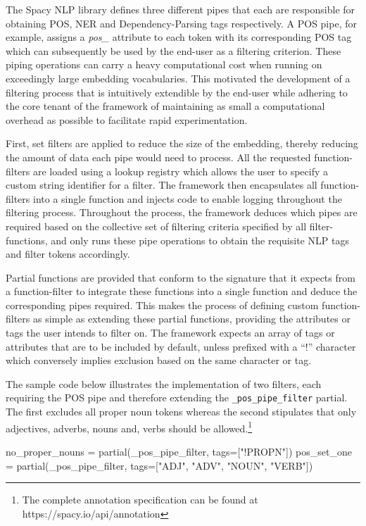 \documentclass[../../fyp.tex]{subfiles}
\begin{document}
The Spacy NLP library defines three different pipes that each are responsible for obtaining POS, NER and Dependency-Parsing tags respectively. A POS pipe, for example, assigns a \textit{pos\_} attribute to each token with its corresponding POS tag which can subsequently be used by the end-user as a filtering criterion. These piping operations can carry a heavy computational cost when running on exceedingly large embedding vocabularies. This motivated the development of a filtering process that is intuitively extendible by the end-user while adhering to the core tenant of the framework of maintaining as small a computational overhead as possible to facilitate rapid experimentation.

First, set filters are applied to reduce the size of the embedding, thereby reducing the amount of data each pipe would need to process. All the requested function-filters are loaded using a lookup registry which allows the user to specify a custom string identifier for a filter. The framework then encapsulates all function-filters into a single function and injects code to enable logging throughout the filtering process. Throughout the process, the framework deduces which pipes are required based on the collective set of filtering criteria specified by all filter-functions, and only runs these pipe operations to obtain the requisite NLP tags and filter tokens accordingly.

Partial functions are provided that conform to the signature that it expects from a function-filter to integrate these functions into a single function and deduce the corresponding pipes required. This makes the process of defining custom function-filters as simple as extending these partial functions, providing the attributes or tags the user intends to filter on. The framework expects an array of tags or attributes that are to be included by default, unless prefixed with a \enquote{!} character which conversely implies exclusion based on the same character or tag. 

The sample code below illustrates the implementation of two filters, each requiring the POS pipe and therefore extending the \texttt{\_pos\_pipe\_filter} partial. The first excludes all proper noun tokens whereas the second stipulates that only adjectives, adverbs, nouns and, verbs should be allowed.\footnote{The complete annotation specification can be found at https://spacy.io/api/annotation} 

\begin{code}
no_proper_nouns = partial(_pos_pipe_filter, tags=["!PROPN"])
pos_set_one = partial(_pos_pipe_filter, tags=["ADJ", "ADV", "NOUN", "VERB"])
\end{code}
\end{document}
